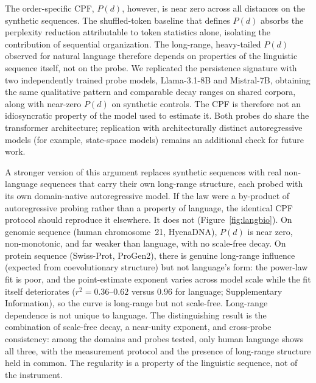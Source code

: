 \documentclass[11pt]{article}
\begin{document}
The order-specific CPF, $P(d)$, however, is near zero across all
distances on the synthetic sequences. The shuffled-token baseline that defines $P(d)$
absorbs the perplexity reduction attributable to token statistics alone, isolating the
contribution of sequential organization. The long-range, heavy-tailed $P(d)$ observed
for natural language therefore depends on properties of the linguistic sequence
itself, not on the probe. We replicated the persistence signature with two
independently trained probe models, Llama-3.1-8B and Mistral-7B, obtaining the same
qualitative pattern and comparable decay ranges on shared corpora, along with near-zero
$P(d)$ on synthetic controls. The CPF is therefore not an idiosyncratic
property of the model used to estimate it. Both probes do share the transformer architecture;
replication with architecturally distinct autoregressive models (for example, state-space models)
remains an additional check for future work.

A stronger version of this argument replaces synthetic sequences with real non-language
sequences that carry their own long-range structure, each probed with its own domain-native
autoregressive model. If the law were a by-product of autoregressive probing rather than a
property of language, the identical CPF protocol should reproduce it elsewhere. It does not
(Figure~\ref{fig:langbio}).
On genomic sequence (human chromosome~21, HyenaDNA), $P(d)$ is near zero, non-monotonic, and
far weaker than language, with no scale-free decay. On protein sequence (Swiss-Prot, ProGen2),
there is genuine long-range influence (expected from coevolutionary structure) but not
language's form: the power-law fit is poor, and the point-estimate exponent varies across model
scale while the fit itself deteriorates ($r^2 = 0.36$--$0.62$ versus $0.96$ for language;
Supplementary Information), so the curve is long-range but not scale-free. Long-range dependence
is not unique to language. The distinguishing result is the combination of scale-free decay, a
near-unity exponent, and cross-probe consistency: among the domains and probes tested, only human
language shows all three, with the measurement protocol and the presence of long-range structure
held in common. The regularity is a property of the linguistic sequence, not of the instrument.
\end{document}

